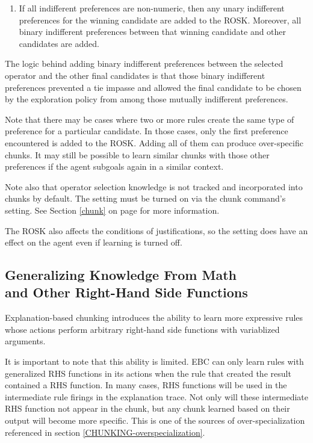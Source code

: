 \begin{description}
\begin{enumerate}
		\item If all indifferent preferences are non-numeric, then any unary indifferent preferences for the winning candidate are added to the ROSK. Moreover, all binary indifferent preferences between that winning candidate and other candidates are added.
	\end{enumerate}
	The logic behind adding binary indifferent preferences between the selected operator and the other final candidates is that those binary indifferent preferences prevented a tie impasse and allowed the final candidate to be chosen by the exploration policy from among those mutually indifferent preferences.
\end{description}

Note that there may be cases where two or more rules create the same type of preference for a particular candidate. In those cases, only the first preference encountered is added to the ROSK. Adding all of them can produce over-specific chunks. It may still be possible to learn similar chunks with those other preferences if the agent subgoals again in a similar context.

Note also that operator selection knowledge is not tracked and incorporated into chunks by default. The setting must be turned on via the chunk command's  setting. See Section \ref{chunk} on page \pageref{chunk} for more information. 

The ROSK also affects the conditions of justifications, so the  setting does have an effect on the agent even if learning is turned off.

\subsection{Generalizing Knowledge From Math \\ and Other Right-Hand Side Functions}
\label{CHUNKING-rhs-functions}

Explanation-based chunking introduces the ability to learn more expressive rules whose actions perform arbitrary right-hand side functions with variablized arguments.  

It is important to note that this ability is limited.  EBC can only learn rules with generalized RHS functions in its actions when the rule that created the result contained a RHS function.  In many cases, RHS functions will be used in the intermediate rule firings in the explanation trace.  Not only will these intermediate RHS function not appear in the chunk, but any chunk learned based on their output will become more specific.  This is one of the sources of over-specialization referenced in section \ref{CHUNKING-overspecialization}.
 
